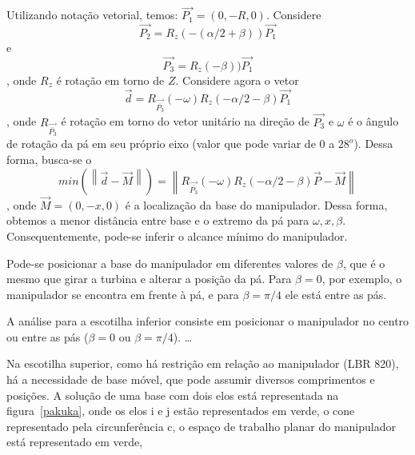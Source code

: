 Utilizando notação vetorial, temos: $\overrightarrow{P_1} = (0,-R,0)$. Considere
$$\overrightarrow{{P_2}} = R_z(-(\alpha/2 + \beta))
\overrightarrow{P_1}$$ e $$\overrightarrow{{P_3}} = R_z(-\beta))
\overrightarrow{P_1}$$ , onde $R_z$ é rotação em  torno de $Z$. Considere agora
o vetor $$\overrightarrow{d} =
R_{\overrightarrow{\overline{P_3}}}(-\omega)R_z(-\alpha/2 -
\beta)\overrightarrow{P_1}$$, onde $R_{\overrightarrow{\overline{P_3}}}$ é rotação em torno do vetor unitário
na direção de $\overrightarrow{P_3}$ e $\omega$ é o ângulo de rotação da pá em
seu próprio eixo (valor que pode variar de $0$ a $28^o$).
Dessa forma, busca-se o $$min (\left \| \overrightarrow{d} - \overrightarrow{M} 
\right \|) =\left \| R_{\overrightarrow{\overline{P_3}}}(-\omega)R_z(-\alpha/2 -
\beta)\overrightarrow{P} - \overrightarrow{M} \right \|$$, onde
$\overrightarrow{M}=(0,-x,0)$ é a localização da base do manipulador. Dessa
forma, obtemos a menor distância entre base e o extremo da pá para $\omega,
x, \beta$. Consequentemente, pode-se inferir o alcance mínimo do manipulador.

Pode-se posicionar a base do manipulador em diferentes valores de $\beta$, que é
o mesmo que girar a turbina e alterar a posição da pá. Para $\beta = 0$, por
exemplo, o manipulador se encontra em frente à pá, e para $\beta = \pi/4$ ele está entre as pás.

A análise para a escotilha inferior consiste em posicionar o manipulador no
centro ou entre as pás ($\beta = 0$ ou $\beta = \pi/4$). \ldots 

Na escotilha superior, como há restrição em relação ao manipulador (LBR 820), há
a necessidade de base móvel, que pode assumir diversos comprimentos e posições.
A solução de uma base com dois elos está representada na figura~\ref{pakuka},
onde os elos i e j estão representados em verde, o cone representado pela
circunferência c, o espaço de trabalho planar do manipulador está representado
em verde, 

